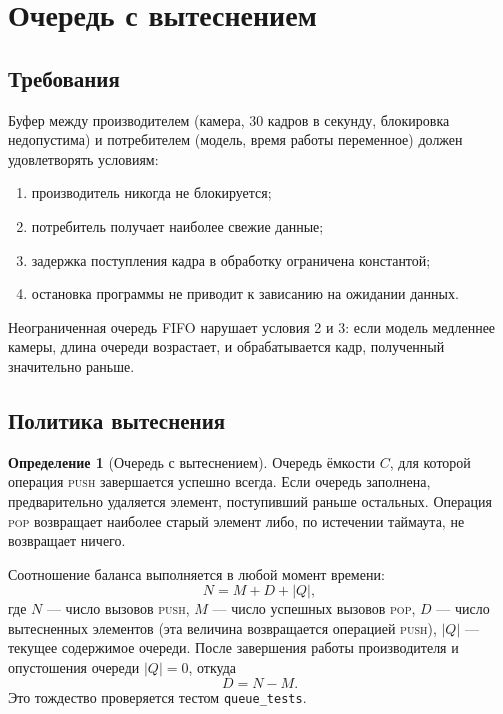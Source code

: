 \documentclass[11pt,a4paper]{article}
\theoremstyle{definition}
\newtheorem{definition}{Определение}[section]
\theoremstyle{remark}
\begin{document}
\section{Очередь с вытеснением}
\label{sec:queue}

\subsection{Требования}

Буфер между производителем (камера, 30 кадров в секунду, блокировка
недопустима) и потребителем (модель, время работы переменное) должен
удовлетворять условиям:

\begin{enumerate}
  \item производитель никогда не блокируется;
  \item потребитель получает наиболее свежие данные;
  \item задержка поступления кадра в обработку ограничена константой;
  \item остановка программы не приводит к зависанию на ожидании данных.
\end{enumerate}

Неограниченная очередь FIFO нарушает условия 2 и 3: если модель медленнее
камеры, длина очереди возрастает, и обрабатывается кадр, полученный
значительно раньше.

\subsection{Политика вытеснения}

\begin{definition}[Очередь с вытеснением]
Очередь ёмкости $C$, для которой операция \textsc{push} завершается успешно
всегда. Если очередь заполнена, предварительно удаляется элемент, поступивший
раньше остальных. Операция \textsc{pop} возвращает наиболее старый элемент
либо, по истечении таймаута, не возвращает ничего.
\end{definition}

Соотношение баланса выполняется в любой момент времени:
\[
  N = M + D + |Q|,
\]
где $N$ --- число вызовов \textsc{push}, $M$ --- число успешных вызовов
\textsc{pop}, $D$ --- число вытесненных элементов (эта величина возвращается
операцией \textsc{push}), $|Q|$ --- текущее содержимое очереди. После
завершения работы производителя и опустошения очереди $|Q| = 0$, откуда
\[
  D = N - M .
\]
Это тождество проверяется тестом \texttt{queue\_tests}.
\end{document}
